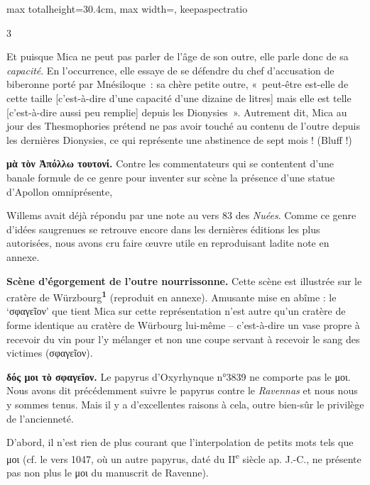 \documentclass[11pt,twoside]{book}
\newcommand{\italique}[1]{\textit{#1}}
\newcommand{\nieme}[1]{#1\textsuperscript{e}}
\newcommand{\marqueur}[1]{\textsuperscript{\color{rubricRed}\textbf{#1}}}
\begin{document}
\begin{adjustbox}{max totalheight=30.4cm, max width=\textwidth, keepaspectratio}
\begin{minipage}{\textwidth}
{\begin{multicols}{3}
\par\vspace{1.5pt}
\noindent Et puisque Mica ne peut pas parler de l'âge de son outre, elle parle donc de sa \italique{capacité}. En l'occurrence, elle essaye de se défendre du chef d'accusation de biberonne porté par Mnésiloque~: sa chère petite outre, «~peut-être est-elle de cette taille [c'est-à-dire d'une capacité d'une dizaine de litres] mais elle est telle [c'est-à-dire aussi peu remplie] depuis les Dionysies~». Autrement dit, Mica au jour des Thesmophories prétend ne pas avoir touché au contenu de l'outre depuis les dernières Dionysies, ce qui représente une abstinence de sept mois ! (Bluff !)
\par\vspace{1.5pt}
 \textbf{μὰ τὸν Ἀπόλλω τουτονί.} Contre les commentateurs qui se contentent d'une banale formule de ce genre pour inventer sur scène la présence d'une statue d'Apollon omniprésente,
\par\vspace{1.5pt}
\noindent Willems avait déjà répondu par une note au vers 83 des \italique{Nuées}. Comme ce genre d'idées saugrenues se retrouve encore dans les dernières éditions les plus autorisées, nous avons cru faire œuvre utile en reproduisant ladite note en annexe.
\par\vspace{1.5pt}
 \textbf{Scène d'égorgement de l'outre nourrissonne.} Cette scène est illustrée sur le cratère de Würzbourg\marqueur{1} (reproduit en annexe). Amusante mise en abîme : le `σφαγεῖον' que tient Mica sur cette représentation n'est autre qu'un cratère de forme identique au cratère de Würbourg lui-même -- c'est-à-dire un vase propre à recevoir du vin pour l'y mélanger et non une coupe servant à recevoir le sang des victimes (σφαγεῖον).
\par\vspace{1.5pt}
 \textbf{δός μοι τὸ σφαγεῖον.} Le papyrus d'Oxyrhynque n°3839 ne comporte pas le μοι. Nous avons dit précédemment suivre le papyrus contre le \italique{Ravennas} et nous nous y sommes tenus. Mais il y a d'excellentes raisons à cela, outre bien-sûr le privilège de l'ancienneté.
\par\vspace{1.5pt}
\noindent D'abord, il n'est rien de plus courant que l'interpolation de petits mots tels que μοι (cf. le vers 1047, où un autre papyrus, daté du \nieme{II} siècle ap. J.-C., ne présente pas non plus le μοι du manuscrit de Ravenne).

\end{multicols}}
\end{minipage}
\end{adjustbox}
\end{document}
